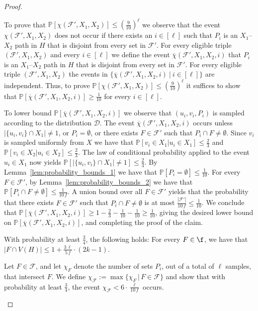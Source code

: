\begin{proof}
\begin{claimproof}
        To prove that $\mathbb{P}[\chi(\mathcal{F}', X_1, X_2)] \leq (\frac{9}{10})^\ell$ we observe that the event $\chi(\mathcal{F}', X_1, X_2)$ does not occur if there exists an $i \in [\ell]$ such that $P_i$ is an $X_1$--$X_2$ path in $H$ that is disjoint from every set in $\mathcal{F}'$. For every eligible triple $(\mathcal{F}', X_1, X_2)$ and every $i \in [\ell]$ we define the event $\overline{\chi}(\mathcal{F}', X_1, X_2, i)$ that $P_i$ is an $X_1$--$X_2$ path in $H$ that is disjoint from every set in $\mathcal{F}'$. For every eligible triple $(\mathcal{F}', X_1, X_2)$ the events in $\{\overline{\chi}(\mathcal{F}', X_1, X_2, i) ~|~ i \in [\ell]\}$ are independent. Thus, to prove  $\mathbb{P}[\chi(\mathcal{F}', X_1, X_2)] \leq (\frac{9}{10})^\ell$ it suffices to show that $\mathbb{P}[\overline{\chi}(\mathcal{F}', X_1, X_2, i)] \geq \frac{1}{10}$ for every $i \in [\ell]$.
        
        To lower bound $\mathbb{P}[\overline{\chi}(\mathcal{F}', X_1, X_2, i)]$ we observe that $(u_i, v_i, P_i)$ is sampled according to the distribution $\mathcal{D}$. The event $\overline{\chi}(\mathcal{F}', X_1, X_2, i)$ occurs unless $|\{u_i, v_i\} \cap X_1| \neq 1$, or $P_i = \emptyset$, or there exists $F \in \mathcal{F}'$ such that $P_i \cap F \neq \emptyset$. Since $v_i$ is sampled uniformly from $X$ we have that  $\mathbb{P}[v_i \in X_1 | u_i \in X_1] \leq \frac{2}{3}$ and $\mathbb{P}[v_i \in X_2 | u_i \in X_2] \leq \frac{2}{3}$. The law of conditional probability applied to the event $u_i \in X_1$ now yields $\mathbb{P}[|\{u_i, v_i\} \cap X_1| \neq 1] \leq \frac{2}{3}$. By Lemma~\ref{lem:probability_bounds_1} we have that $\mathbb{P}[P_i = \emptyset] \leq \frac{1}{10}$. For every $F \in \mathcal{F}'$, by Lemma~\ref{lem:probability_bounds_2} we have that $\mathbb{P}[P_i \cap F \neq \emptyset] \leq \frac{1}{10\,f}$. A union bound over all $F \in \mathcal{F}'$ yields that the probability that there exists $F \in \mathcal{F}'$ such that $P_i \cap F \neq \emptyset$ is at most $\frac{|\mathcal{F}'|}{10\,f} \leq \frac{1}{10}$. We conclude that $\mathbb{P}[\overline{\chi}(\mathcal{F}', X_1, X_2, i)] \geq 1 - \frac{2}{3} - \frac{1}{10} - \frac{1}{10} \geq \frac{1}{10}$, giving the desired lower bound on $\mathbb{P}[\overline{\chi}(\mathcal{F}', X_1, X_2, i)]$, and completing the proof of the claim. 
    \end{claimproof}

    \begin{claim}\label{claim:max_deg}
        With probability at least $\frac{3}{4}$, the following holds: For every $F\in\f$, we have that $|F\cap V(H)|\leq 1 + \frac{3\, \ell}{5\, f}\cdot (2k-1)$.
    \end{claim}
    \begin{claimproof}
        Let $F \in \mathcal{F}$, and let $\chi_F$ denote the number of sets $P_i$, out of a total of $\ell$ samples, that intersect $F$. We define $\chi_{\mathcal{F}} := \max\{\chi_F\, |\, F\in\mathcal{F}\}$ and show that with probability at least $\frac{3}{4}$, the event $\chi_{\mathcal{F}} < 6\cdot \frac{\ell}{10\,f}$ occurs. 
        

\end{claimproof}
\end{proof}
